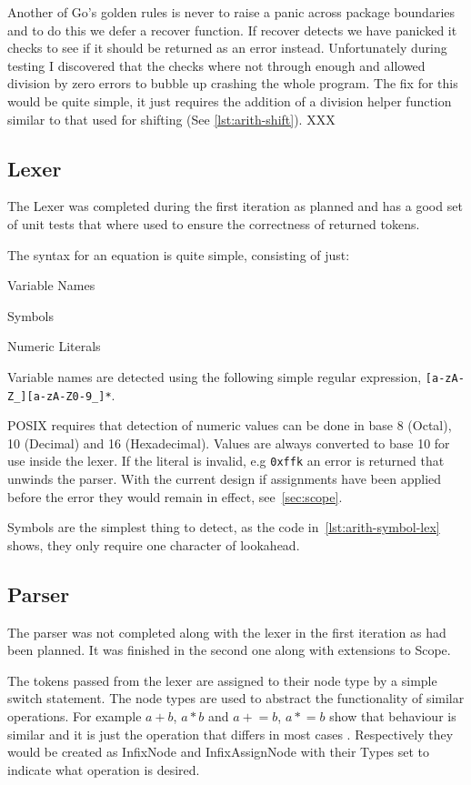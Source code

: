 Another of Go's golden rules is never to raise a panic across package boundaries and to do this we defer a recover function.
If recover detects we have panicked it checks to see if it should be returned as an error instead.
Unfortunately during testing I discovered that the checks where not through enough and allowed division by zero errors to bubble up crashing the whole program. 
The fix for this would be quite simple, it just requires the addition of a division helper function similar to that used for shifting (See \ref{lst:arith-shift}). XXX %
\newpage %
\subsection{Lexer}
The Lexer was completed during the first iteration as planned and has a good set of unit tests that where used to ensure the correctness of returned tokens.

The syntax for an equation is quite simple, consisting of just:
\begin{itemize*}
	\item Variable Names
    \item Symbols
	\item Numeric Literals
\end{itemize*}

Variable names are detected using the following simple regular expression, \verb![a-zA-Z_][a-zA-Z0-9_]*!.

POSIX requires that detection of numeric values can be done in base 8 (Octal), 10 (Decimal) and 16 (Hexadecimal).
Values are always converted to base 10 for use inside the lexer.
If the literal is invalid, e.g \verb!0xffk! an error is returned that unwinds the parser.
With the current design if assignments have been applied before the error they would remain in effect, see~\ref{sec:scope}.

Symbols are the simplest thing to detect, as the code in~\ref{lst:arith-symbol-lex} shows, they only require one character of lookahead.

\subsection{Parser}
The parser was not completed along with the lexer in the first iteration as had been planned.
It was finished in the second one along with extensions to Scope.

The tokens passed from the lexer are assigned to their node type by a simple switch statement.
The node types are used to abstract the functionality of similar operations.
For example $a + b$, $a * b$ and $a \mathrel{+}= b$, $a \mathrel{*}= b$ show that behaviour is similar and it is just the operation that differs in most cases .
Respectively they would be created as InfixNode and InfixAssignNode with their Types set to indicate what operation is desired.

